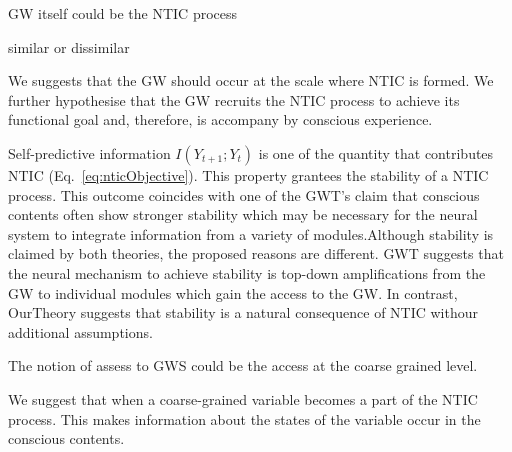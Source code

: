 \documentclass[utf8]{article}
\begin{document}
		GW itself could be the NTIC process 
		
		similar or dissimilar 
		
		
		We suggests that the GW should occur at the scale where NTIC is formed. 
		We further hypothesise that the GW recruits the NTIC process to achieve its functional goal and, therefore, is accompany by conscious experience. 
		
		Self-predictive information $I(Y_{t+1};Y_{t})$ is one of the quantity that contributes  NTIC (Eq.~\ref{eq:nticObjective}). This property grantees the stability of a NTIC process. This outcome coincides with one of the GWT's claim that conscious contents often show stronger stability which may be necessary for the neural system to integrate information from a variety of modules.Although stability is claimed by both theories, the proposed reasons are different. GWT suggests that the neural mechanism to achieve stability is top-down amplifications from the GW to individual modules which gain the access to the GW. In contrast, \ac{OurTheory} suggests that stability is a natural consequence of NTIC withour additional assumptions.
		
		The notion of assess to GWS could be the access at the coarse grained level. 
		
		We suggest that when a coarse-grained variable becomes a part of the NTIC process. This makes information about the states of the variable occur in the conscious contents. 
		
		
		
		    
		
\end{document}
